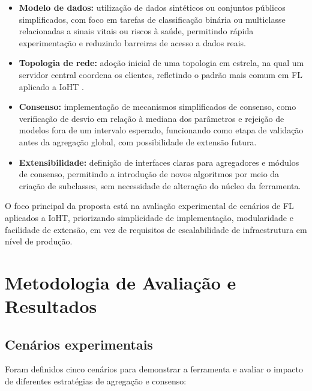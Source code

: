 \documentclass[12pt]{article}
\begin{document}
\begin{itemize}
    \item \textbf{Modelo de dados:} utilização de dados sintéticos ou conjuntos públicos simplificados, com foco em tarefas de classificação binária ou multiclasse relacionadas a sinais vitais ou riscos à saúde, permitindo rápida experimentação e reduzindo barreiras de acesso a dados reais.
    
    \item \textbf{Topologia de rede:} adoção inicial de uma topologia em estrela, na qual um servidor central coordena os clientes, refletindo o padrão mais comum em FL aplicado a IoHT \cite{Zhang2024_FLIoTSurvey}.
    
    \item \textbf{Consenso:} implementação de mecanismos simplificados de consenso, como verificação de desvio em relação à mediana dos parâmetros e rejeição de modelos fora de um intervalo esperado, funcionando como etapa de validação antes da agregação global, com possibilidade de extensão futura.
    
    \item \textbf{Extensibilidade:} definição de interfaces claras para agregadores e módulos de consenso, permitindo a introdução de novos algoritmos por meio da criação de subclasses, sem necessidade de alteração do núcleo da ferramenta.
\end{itemize}

O foco principal da proposta está na avaliação experimental de cenários de FL aplicados a IoHT, priorizando simplicidade de implementação, modularidade e facilidade de extensão, em vez de requisitos de escalabilidade de infraestrutura em nível de produção.

\section{Metodologia de Avaliação e Resultados}
\label{sec:avaliacao}

\subsection{Cenários experimentais}

Foram definidos cinco cenários para demonstrar a ferramenta e avaliar o impacto de diferentes estratégias de agregação e consenso:
\end{document}
